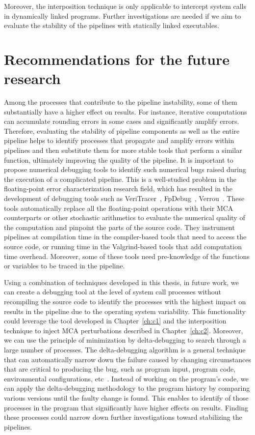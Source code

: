 Moreover, the interposition technique is only applicable to intercept system calls in dynamically linked programs. 
Further investigations are needed if we aim to evaluate the stability of the pipelines with statically linked executables.


\section{Recommendations for the future research}

Among the processes that contribute to the pipeline instability, some of them substantially
have a higher effect on results. For instance, iterative computations can accumulate rounding errors in
some cases and significantly amplify errors. Therefore, evaluating the stability of pipeline components as
well as the entire pipeline helps to identify processes that propagate and amplify errors within pipelines and
then substitute them for more stable tools that perform a similar function, ultimately improving the quality
of the pipeline.
It is important to propose numerical debugging tools to identify such numerical bugs raised during the
execution of a complicated pipeline. This is a well-studied problem in the floating-point error characterization
research field, which has resulted in the development of debugging tools such as VeriTracer~\cite{chatelain2018veritracer},
FpDebug~\cite{benz2012dynamic}, Verrou~\cite{fevotte2019debugging}.
These tools automatically replace all the floating-point operations with their MCA counterparts
or other stochastic arithmetics to evaluate the numerical quality of the computation and pinpoint the parts
of the source code. They instrument pipelines at compilation time in the compiler-based tools that need to
access the source code, or running time in the Valgrind-based tools that add computation time overhead.
Moreover, some of these tools need pre-knowledge of the functions or variables to be traced in the pipeline.

Using a combination of techniques developed in this thesis, in future work,
we can create a debugging tool at the level of system call processes without
recompiling the source code to identify the processes with the highest impact on results in the pipeline due
to the operating system variability. 
This functionality could leverage the tool
developed in Chapter~\ref{ch:c1} and the interposition technique to inject MCA perturbations described in Chapter~\ref{ch:c2}.
Moreover, we can use the principle of minimization by delta-debugging to search through a large number of processes. 
The delta-debugging algorithm is a general technique that can automatically narrow down the failure caused by changing circumstances
that are critical to producing the bug, such as program input, program code, environmental configurations,
etc~\cite{zeller1999yesterday,zeller2002isolating}. Instead of working on the program's code, we can apply the delta-debugging methodology to the
program history by comparing various versions until the faulty change is found. This enables to identify
of those processes in the program that significantly have higher effects on results. Finding these processes could
narrow down further investigations toward stabilizing the pipelines.

